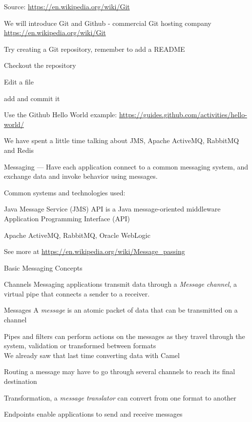 \documentclass[Screen16to9,17pt]{foils}
\begin{document}
Source: \url{https://en.wikipedia.org/wiki/Git}

\begin{list2}
\item We will introduce Git and Github - commercial Git hosting company\\
\url{https://en.wikipedia.org/wiki/Git}
\item Try creating a Git repository, remember to add a README
\item Checkout the repository
\item Edit a file
\item add and commit it
\end{list2}

Use the Github Hello World example: \url{https://guides.github.com/activities/hello-world/}




We have spent a little time talking about
JMS, Apache ActiveMQ, RabbitMQ and Redis





Messaging — Have each application connect to a common messaging system, and exchange data and invoke behavior using messages.

Common systems and technologies used:
\begin{list2}
\item Java Message Service (JMS) API is a Java message-oriented middleware Application Programming Interface (API)
\item Apache ActiveMQ, RabbitMQ, Oracle WebLogic
\item See more at \url{https://en.wikipedia.org/wiki/Message_passing}
\end{list2}





Basic Messaging Concepts
\begin{list2}
\item Channels Messaging applications transmit data through a \emph{Message channel}, a virtual pipe that connects a sender to a receiver.
\item Messages A \emph{message} is an atomic packet of data that can be transmitted on a channel
\item Pipes and filters can perform actions on the messages as they travel through the system, validation or transformed between formats\\
We already saw that last time converting data with Camel
\item Routing a message may have to go through several channels to reach its final destination
\item Transformation, a \emph{message translator} can convert from one format to another
\item Endpoints enable applications to send and receive messages
\end{list2}
\end{document}
